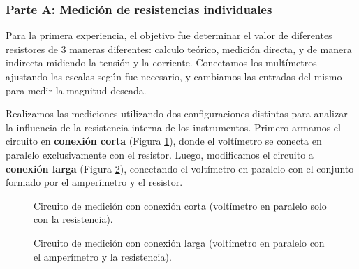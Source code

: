 \documentclass[11pt]{article}
\begin{document}
\subsubsection*{Parte A: Medición de resistencias individuales}
Para la primera experiencia, el objetivo fue determinar el valor de diferentes resistores de 3 maneras diferentes: calculo teórico, medición directa, y de manera indirecta midiendo la tensión y la corriente. Conectamos los multímetros ajustando las escalas según fue necesario, y cambiamos las entradas del mismo para medir la magnitud deseada.

Realizamos las mediciones utilizando dos configuraciones distintas para analizar la influencia de la resistencia interna de los instrumentos. Primero armamos el circuito en \textbf{conexión corta} (Figura \ref{fig:corta}), donde el voltímetro se conecta en paralelo exclusivamente con el resistor. Luego, modificamos el circuito a \textbf{conexión larga} (Figura \ref{fig:larga}), conectando el voltímetro en paralelo con el conjunto formado por el amperímetro y el resistor.
\begin{figure}[H]
    \centering
    \caption{Circuito de medición con conexión corta (voltímetro en paralelo solo con la resistencia).}
    \label{fig:corta}
\end{figure}

\begin{figure}[H]
    \centering
    \caption{Circuito de medición con conexión larga (voltímetro en paralelo con el amperímetro y la resistencia).}
    \label{fig:larga}
\end{figure}
\end{document}

